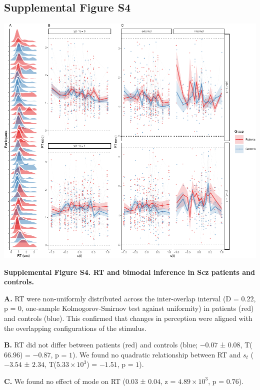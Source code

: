 \documentclass[
]{article}
\begin{document}
\newpage

\hypertarget{supplemental-figure-s4}{%
\subsection{Supplemental Figure S4}\label{supplemental-figure-s4}}

\includegraphics{modes_ketamine_scz_files/figure-latex/Supplemental_Figure_S4-1.pdf}

\textbf{Supplemental Figure S4. RT and bimodal inference in Scz patients
and controls.}

\textbf{A.} RT were non-uniformly distributed across the inter-overlap
interval (D = \(0.22\), p = \(0\), one-sample Kolmogorov-Smirnov test
against uniformity) in patients (red) and controls (blue). This
confirmed that changes in perception were aligned with the overlapping
configurations of the stimulus.

\textbf{B.} RT did not differ between patients (red) and controls (blue;
\(-0.07\) ± \(0.08\), T(\(66.96\)) = \(-0.87\), p = \(1\)). We found no
quadratic relationship between RT and \(s_t\) (\(-3.54\) ± \(2.34\),
T(\(\ensuremath{5.33\times 10^{3}}\)) = \(-1.51\), p = \(1\)).

\textbf{C.} We found no effect of mode on RT (\(0.03\) ± \(0.04\), z =
\(\ensuremath{4.89\times 10^{3}}\), p = \(0.76\)).

\newpage
\end{document}
